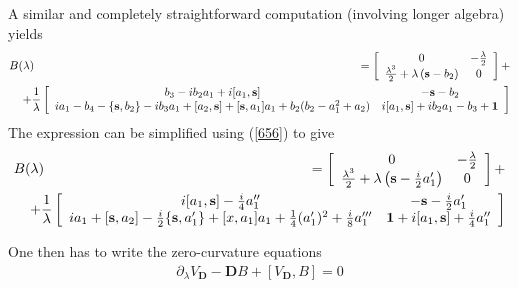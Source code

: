 \documentclass{article}
\def\ss{\mathbf s}
\def \D{{\mathbf D}}
\def\&{&\hspace{-20pt}}
\def\1{\mathbf 1}
\def \pa{\partial}
\newcommand{\be}{\begin{eqnarray}}
\newcommand{\ee}{\end{eqnarray}}
\def\le{\left}
\def\ri{\right}
\begin{document}
A similar and completely straightforward computation (involving longer algebra) yields 
\be
B(\lambda)&\&  = \le[
\begin{array}{cc}
0 & -\frac \lambda 2 \\
\frac {\lambda^3} 2 + \lambda\le(\ss -b_2\ri)  & 0 
\end{array}
\ri] +\\
&\& +  \frac 1 \lambda \le[
\begin{array}{cc}
b_3 - i b_2 a_1+ i[a_1,\ss] &  - \ss - b_2\\
ia_1 - b_4 -\{\ss,b_2\}  - ib_3 a_1 +[a_2,\ss] + [\ss,a_1]a_1 + b_2(b_2 - a_1^2 +  a_2) & 
i[a_1,\ss] + ib_2 a_1 - b_3 + \1 
\end{array}
\ri]
\ee
The expression can be simplified using (\ref{656}) to give
\be
B(\lambda)&\&  = \le[
\begin{array}{cc}
0 & -\frac \lambda 2 \\
\frac {\lambda^3} 2 + \lambda\le(\ss -\frac i 2 a_1'\ri)  & 0 
\end{array}
\ri] +\\
&\& +  \frac 1 \lambda \le[
\begin{array}{cc}
 i[a_1,\ss] - \frac i 4 a_1''
  &  - \ss -\frac i 2 a_1'\\
ia_1 +[\ss,a_2]  - \frac i 2 \{\ss, a_1'\}  + [x,a_1]a_1+ \frac 1 4 (a_1')^2 + \frac i 8 a_1'''
 & 
\1 + i[a_1,\ss] + \frac i 4 a_1''
\end{array}
\ri]
\label{LaxB}
\ee

One then has to write the zero-curvature equations 
\be
\pa_\lambda V_\D - \D B + [V_\D , B]=0\label{zerobv}
\ee
\end{document}
